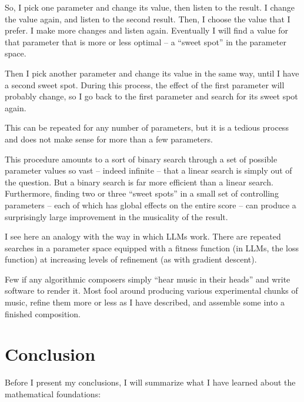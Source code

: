 \documentclass[]{interact}
\theoremstyle{plain}%
\theoremstyle{definition}
\theoremstyle{remark}
\begin{document}
So, I pick one parameter and change its value, then listen to the result. I change the value again, and listen to the second result. Then, I choose the value that I prefer. I make more changes and listen again. Eventually I will find a value for that parameter that is more or less optimal – a ``sweet spot'' in the parameter space.

Then I pick another parameter and change its value in the same way, until I have a second sweet spot. During this process, the effect of the first parameter will probably change, so I go back to the first parameter and search for its sweet spot again.

This can be repeated for any number of parameters, but it is a tedious process and does not make sense for more than a few parameters.

This procedure amounts to a sort of binary search through a set of possible parameter values so vast – indeed infinite – that a linear search is simply out of the question. But a binary search is far more efficient than a linear search. Furthermore, finding two or three ``sweet spots'' in a small set of controlling parameters – each of which has global effects on the entire score – can produce a surprisingly large improvement in the musicality of the result.

I see here an analogy with the way in which LLMs work. There are repeated searches in a parameter space equipped with a fitness function (in LLMs, the loss function) at increasing levels of refinement (as with gradient descent).

Few if any algorithmic composers simply ``hear music in their heads'' and write software to render it. Most fool around producing various experimental chunks of music, refine them more or less as I have described, and assemble some into a finished composition.

\section{Conclusion}

Before I present my conclusions, I will summarize what I have learned about the mathematical foundations:
\end{document}
